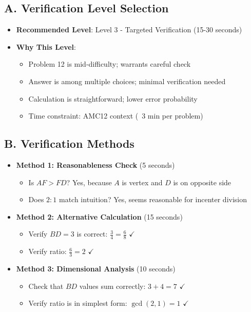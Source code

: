 \documentclass[12pt]{article}
\begin{document}
\begin{verificationbox}
\subsection*{A. Verification Level Selection}
\begin{itemize}[leftmargin=*]
    \item \textbf{Recommended Level}: Level 3 - Targeted Verification (15-30 seconds)
    
    \item \textbf{Why This Level}:
    \begin{itemize}
        \item Problem 12 is mid-difficulty; warrants careful check
        \item Answer is among multiple choices; minimal verification needed
        \item Calculation is straightforward; lower error probability
        \item Time constraint: AMC12 context (~3 min per problem)
    \end{itemize}
\end{itemize}

\subsection*{B. Verification Methods}
\begin{itemize}[leftmargin=*]
    \item \textbf{Method 1: Reasonableness Check} (5 seconds)
    \begin{itemize}
        \item Is $AF > FD$? Yes, because $A$ is vertex and $D$ is on opposite side
        \item Does $2:1$ match intuition? Yes, seems reasonable for incenter division
    \end{itemize}
    
    \item \textbf{Method 2: Alternative Calculation} (15 seconds)
    \begin{itemize}
        \item Verify $BD = 3$ is correct: $\frac{3}{4} = \frac{6}{8}$ $\checkmark$
        \item Verify ratio: $\frac{6}{3} = 2$ $\checkmark$
    \end{itemize}
    
    \item \textbf{Method 3: Dimensional Analysis} (10 seconds)
    \begin{itemize}
        \item Check that $BD$ values sum correctly: $3 + 4 = 7$ $\checkmark$
        \item Verify ratio is in simplest form: $\gcd(2, 1) = 1$ $\checkmark$
    \end{itemize}
    

\end{itemize}
\end{verificationbox}
\end{document}
